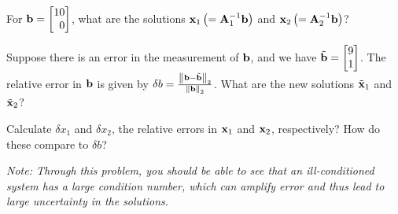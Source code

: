 \documentclass[9pt]{article}
\def\mf{\ensuremath\mathbf}
\def\lp{\ensuremath\left(}
\def\rp{\ensuremath\right)}
\def\lV{\ensuremath\left\lVert}
\def\rV{\ensuremath\right\rVert}
\def\ls{\ensuremath\left[}
\def\rs{\ensuremath\right]}
\def\bmx{\ensuremath\begin{bmatrix*}[r]}
\def\emx{\ensuremath\end{bmatrix*}}
\begin{document}
\begin{multicols}{2}
\begin{enumerate}
\begin{enumerate}
        For $\mf{b} = \bmx 10 \\ 0\emx$, what are the solutions $\mf{x}_1\lp=\mf{A}_1^{-1}\mf{b}\rp$ and $\mf{x}_2\lp=\mf{A}_2^{-1}\mf{b}\rp$? 

        Suppose there is an error in the measurement of $\mf{b}$, and we have $\tilde{\mf{b}} = \bmx 9 \\ 1\emx$. The relative error in $\mf{b}$ is given by $\delta b = \frac{\lV \mf{b} - \tilde{\mf{b}}\rV_2}{\lV\mf{b}\rV_2}$. What are the new solutions $\tilde{\mf{x}}_1$ and $\tilde{\mf{x}}_2$?

        Calculate $\delta x_1$ and $\delta x_2$, the relative errors in $\mf{x}_1$ and $\mf{x}_2$, respectively? How do these compare to $\delta b$?

        \textit{Note: Through this problem, you should be able to see that an ill-conditioned system has a large condition number, which can amplify error and thus lead to large uncertainty in the solutions.}
    \end{enumerate}



\end{enumerate}
\end{multicols}
\end{document}
